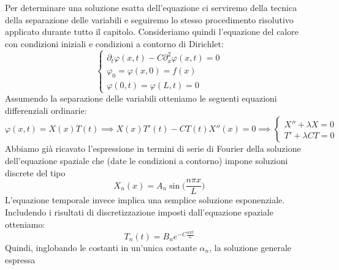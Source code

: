 \documentclass[a4paper,12pt]{report}
\begin{document}
Per determinare una soluzione esatta dell'equazione ci serviremo della tecnica della separazione delle variabili e seguiremo lo stesso procedimento risolutivo applicato durante tutto il capitolo. Consideriamo quindi l'equazione del calore con condizioni iniziali e condizioni a contorno di Dirichlet:
\[\begin{cases}
    \partial_t\varphi(x,t)-C\partial_x^2\varphi(x,t)=0
    \\\varphi_0=\varphi(x,0)=f(x)
    \\\varphi(0,t)=\varphi(L,t)=0
\end{cases}\]
Assumendo la separazione delle variabili otteniamo le seguenti equazioni differenziali ordinarie: 
\[\varphi(x,t)=X(x)T(t)\implies X(x)T'(t)-CT(t)X''(x)=0\implies\begin{cases}
    X''+\lambda X=0
    \\T'+\lambda CT=0
\end{cases}\]
Abbiamo già ricavato l'espressione in termini di serie di Fourier della soluzione dell'equazione spaziale che (date le condizioni a contorno) impone soluzioni discrete del tipo
\[X_n(x)=A_n\sin\bigg(\frac{n\pi x}{L}\bigg)\]
L'equazione temporale invece implica una semplice soluzione esponenziale. Includendo i risultati di discretizzazione imposti dall'equazione spaziale otteniamo:
\[T_n(t)=B_n e^{-C\frac{n\pi t}{L}}\]
Quindi, inglobando le costanti in un'unica costante $\alpha_n$, la soluzione generale espressa 

\newpage
\end{document}
